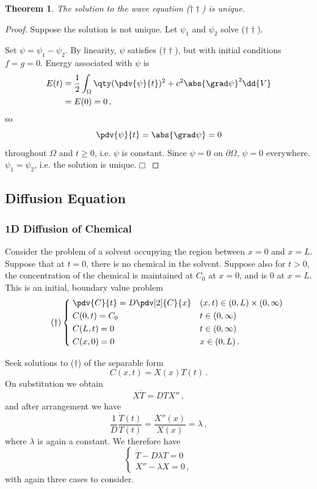 \documentclass{article}
\theoremstyle{plain}\theoremheaderfont{\normalfont\itshape}\theorembodyfont{\rmfamily}\theoremseparator{.}\newtheorem*{rem}{Remark}\newtheorem*{ex}{Example}\newtheorem*{proof}{Proof}\newtheorem*{altp}{Alternative proof}
\theoremstyle{plain}\theoremheaderfont{\normalfont\bfseries}\theorembodyfont{\rmfamily}\theoremseparator{.}\newtheorem{thm}{Theorem}[section]\newtheorem{lem}[thm]{Lemma}\newtheorem{prop}[thm]{Proposition}\newtheorem*{cor}{Corollary}\newtheorem{defn}[thm]{Definition}\newtheorem{clm}[thm]{Claim}\newtheorem{clminproof}{Claim}
\theoremstyle{break}\theoremheaderfont{\normalfont\itshape}\theorembodyfont{\rmfamily}\theoremseparator{.\medskip}\newtheorem*{proofskip}{Proof}\newtheorem*{exs}{Examples}\newtheorem*{rems}{Remarks}
\theoremstyle{break}\theoremheaderfont{\normalfont\bfseries}\theorembodyfont{\rmfamily}\theoremseparator{.\medskip}\newtheorem{lemskip}[thm]{Lemma}\newtheorem{defnskip}[thm]{Definition}\newtheorem{propskip}[thm]{Proposition}\newtheorem{thmskip}[thm]{Theorem}
\numberwithin{equation}{section}
\newcommand{\qed}{\hfill\ensuremath{\Box}}
\begin{document}
	\begin{thm}
		The solution to the wave equation (\(\dagger\dagger\)) is unique.
	\end{thm}
	\begin{proof}
		Suppose the solution is not unique. Let \(\psi_1\) and \(\psi_2\) solve (\(\dagger\dagger\)).

		Set \(\psi=\psi_1-\psi_2\). By linearity, \(\psi\) satisfies (\(\dagger\dagger\)), but with initial conditions \(f=g=0\). Energy associated with \(\psi\) is
		\begin{align*}
			E(t)&=\frac{1}{2}\int_\Omega \qty(\pdv{\psi}{t})^2+c^2\abs{\grad\psi}^2\dd{V}\\
			&=E(0)=0\,,
		\end{align*}
		so
		\[\pdv{\psi}{t}=\abs{\grad\psi}=0\]
		throughout \(\Omega\) and \(t\ge 0\), i.e. \(\psi\) is constant. Since \(\psi=0\) on \(\partial\Omega\), \(\psi=0\) everywhere. \(\psi_1=\psi_2\), i.e. the solution is unique.\qed 
	\end{proof}
	
	\subsection{Diffusion Equation}
	\subsubsection{1D Diffusion of Chemical}
	Consider the problem of a solvent occupying the region between \(x=0\) and \(x=L\). Suppose that at \(t=0\), there is no chemical in the solvent. Suppose also for \(t>0\), the concentration of the chemical is maintained at \(C_0\) at \(x=0\), and is \(0\) at \(x=L\). This is an initial, boundary value problem
	\begin{equation}\tag{\(\dagger\)}
		\left\{\begin{aligned}
			& \;\pdv{C}{t}=D\pdv[2]{C}{x} && (x,t)\in(0,L)\times(0,\infty)\\
			& \;C(0,t)=C_0 && t\in(0,\infty)\\
			& \;C(L,t)=0 && t\in(0,\infty)\\
			& \;C(x,0)=0 && x\in(0,L)\,.
		\end{aligned}\right.
	\end{equation}

	Seek solutions to (\(\dagger\)) of the separable form
	\[C(x,t)=X(x)T(t)\,.\]
	On substitution we obtain
	\[X\dot{T}=DTX''\,,\]
	and after arrangement we have
	\[\frac{1}{D}\frac{\dot{T}(t)}{T(t)}=\frac{X''(x)}{X(x)}=\lambda\,,\]
	where \(\lambda\) is again a constant. We therefore have
	\[\begin{cases}
		\dot{T}-D\lambda T=0\\
		X''-\lambda X=0\,,
	\end{cases}\]
	with again three cases to consider.
	
\end{document}
